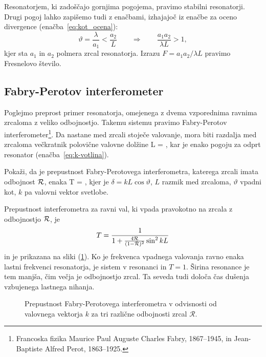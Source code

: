 Resonatorjem, ki zadoščajo gornjima pogojema, pravimo stabilni resonatorji.
Drugi pogoj lahko zapišemo tudi z enačbami, izhajajoč iz enačbe za oceno divergence (enačba~\ref{eq:kot_ocena}):
\begin{equation}
\vartheta = \frac{\lambda}{a_1} < \frac{a_2}{L} \qquad \Rightarrow \qquad
\frac{a_{1}a_{2}}{\lambda L}>1,
\label{eq:Fresnelovo_stevilo}
\end{equation}
kjer sta $a_{1}$ in $a_{2}$ polmera zrcal resonatorja. Izrazu 
$
F = a_{1}a_{2}/\lambda L
$
pravimo Fresnelovo število.

\subsection*{Fabry-Perotov interferometer}
Poglejmo preprost primer resonatorja, omejenega z dvema vzporednima ravnima zrcaloma
z veliko odbojnostjo. Takemu sistemu pravimo Fabry-Perotov 
interferometer\footnote{Francoska fizika Maurice Paul Auguste Charles Fabry, 1867--1945, in 
Jean-Baptiste Alfred Perot, 1863--1925.}. 
Da nastane med zrcali stoječe valovanje, mora biti razdalja 
med zrcaloma večkratnik polovične valovne dolžine
\beq
L = ,
\eeq
kar je enako pogoju za odprt resonator (enačba~\ref{eq:k-votlina}). 

\begin{definition}
Pokaži, da je prepustnost Fabry-Perotovega interferometra, katerega zrcali imata odbojnost $\cal{R}$, enaka 
\beq
T = ,
\eeq
kjer je $\delta = kL\cos{\vartheta}$, $L$ razmik med zrcaloma, $\vartheta$ vpadni kot, 
$k$ pa valovni vektor svetlobe.
\end{definition}

Prepustnost interferometra za ravni val, ki vpada pravokotno na zrcala z
odbojnostjo ${\cal R}$, je 
\begin{equation}
T=\frac{1}{1+\frac{4{\cal R}}{(1-{\cal R})^{2}}\sin^{2}kL}
\label{eq:Fabry-Perot-prepustnost}
\end{equation}
in je prikazana na sliki (\ref{fig:Fabry-Perot}).
Ko je frekvenca vpadnega valovanja ravno enaka lastni frekvenci
resonatorja, je sistem v resonanci in  $T=1$. Širina resonance je tem manjša, čim
večja je odbojnostjo zrcal. Ta seveda tudi določa čas dušenja vzbujenega
lastnega nihanja.\\
\begin{figure}[h]
\centering
\def\svgwidth{110truemm} 

\caption{
Prepustnost Fabry-Perotovega interferometra
v odvisnosti od valovnega vektorja $k$ za tri različne odbojnosti zrcal
$\mathcal{R}.$}
\label{fig:Fabry-Perot}
\end{figure}

